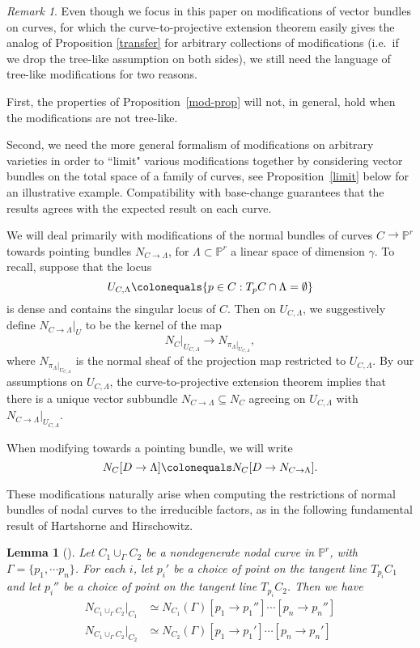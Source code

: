 \documentclass[11pt]{amsart}
\newcommand{\pp}{\mathbb{P}}
\newtheorem{lem}[thm]{Lemma}
\theoremstyle{definition}
\theoremstyle{remark}
\newtheorem{rem}{Remark}
\begin{document}
\begin{rem}
Even though we focus in this paper on modifications of vector bundles on curves,
for which the curve-to-projective extension theorem easily
gives the analog of Proposition \ref{transfer} for arbitrary collections of modifications (i.e.\ if we drop the tree-like assumption on both sides),
we still need the language of tree-like modifications for two reasons.

First, the properties of Proposition~\ref{mod-prop} will not, in general, hold
when the modifications are not tree-like.

Second, 
we need the more general formalism of modifications on
arbitrary varieties in order to ``limit" various modifications together by considering vector bundles on the total space of a family of curves, see Proposition~\ref{limit} below for an illustrative example.  Compatibility with base-change guarantees that the results agrees with the expected result on each curve. 
\end{rem}

We will deal primarily with modifications of the normal bundles of curves $C \to \pp^r$ towards pointing bundles $N_{C \to \Lambda}$, for $\Lambda \subset \pp^r$ a linear space of dimension $\gamma$.  To recall, suppose that the locus 
\[U_{C, \Lambda} \colonequals \{p \in C : T_pC \cap \Lambda = \emptyset\} \]
is dense and contains the singular locus of $C$.  Then on $U_{C, \Lambda}$, we suggestively define $N_{C \to \Lambda}|_U$ to be the kernel of the map
\[N_C|_{U_{C, \Lambda}}\to N_{\pi_\Lambda|_{U_{C, \Lambda}}}, \]
where $N_{\pi_\Lambda|_{U_{C, \Lambda}}}$ is the normal sheaf of the projection map restricted to $U_{C, \Lambda}$.  By our assumptions on $U_{C, \Lambda}$, the curve-to-projective extension theorem implies that there is a unique vector subbundle $N_{C\to \Lambda} \subseteq N_C$ agreeing on $U_{C, \Lambda}$ with $N_{C \to \Lambda}|_{U_{C, \Lambda}}$.

When modifying towards a pointing bundle, we will write
\[N_C[D \to \Lambda] \colonequals N_C[D \to N_{C \to \Lambda}]. \]

These modifications naturally arise when computing the restrictions of normal bundles of nodal curves to the irreducible factors, as in the following fundamental result of Hartshorne and Hirschowitz.

\begin{lem}[{\cite{HH}}]\label{normal_bundle_nodal}
Let $C_1 \cup_\Gamma C_2$ be a nondegenerate nodal curve in $\pp^r$, with $\Gamma = \{p_1, \cdots p_n\}$.  For each $i$, let $p_i'$ be a choice of point on the tangent line $T_{p_i}C_1$ and let $p_i''$ be a choice of point on the tangent line $T_{p_i} C_2$.  Then we have
\begin{align*}
N_{C_1 \cup_\Gamma C_2}|_{C_1} &\simeq N_{C_1}(\Gamma)[p_1 \to p_1''] \cdots [p_n \to p_n''] \\
N_{C_1 \cup_\Gamma C_2}|_{C_2} &\simeq N_{C_2}(\Gamma)[p_1 \to p_1'] \cdots [p_n \to p_n']
\end{align*}
\end{lem}
\end{document}
